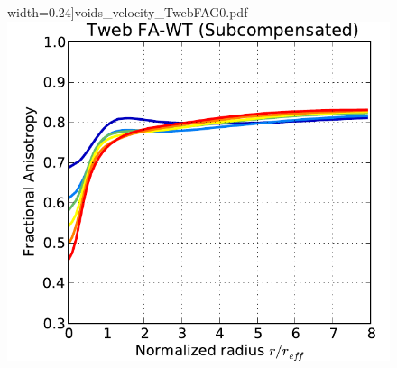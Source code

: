 \documentclass[a4,useAMS,usenatbib,usegraphicx]{mn2e}
\begin{document}
\begin{figure}
  width=0.24\textheight]{voids_velocity_TwebFAG0.pdf}
  \includegraphics[trim = 1mm 0mm 5mm 0mm, clip, keepaspectratio=true,
  width=0.24\textheight]{voids_FA_TwebFAG0.pdf}
  

\end{figure}
\end{document}
